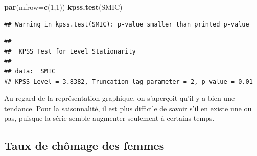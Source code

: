 \documentclass[11pt,]{article}
\newenvironment{Shaded}{\begin{snugshade}}{\end{snugshade}}
\newcommand{\KeywordTok}[1]{\textcolor[rgb]{0.13,0.29,0.53}{\textbf{{#1}}}}
\newcommand{\DataTypeTok}[1]{\textcolor[rgb]{0.13,0.29,0.53}{{#1}}}
\newcommand{\DecValTok}[1]{\textcolor[rgb]{0.00,0.00,0.81}{{#1}}}
\newcommand{\StringTok}[1]{\textcolor[rgb]{0.31,0.60,0.02}{{#1}}}
\newcommand{\NormalTok}[1]{{#1}}
\begin{document}
\begin{Shaded}
\begin{Highlighting}[]
  \KeywordTok{par}\NormalTok{(}\DataTypeTok{mfrow=}\KeywordTok{c}\NormalTok{(}\DecValTok{1}\NormalTok{,}\DecValTok{1}\NormalTok{))}
  \KeywordTok{kpss.test}\NormalTok{(SMIC)}
\end{Highlighting}
\end{Shaded}

\begin{verbatim}
## Warning in kpss.test(SMIC): p-value smaller than printed p-value
\end{verbatim}

\begin{verbatim}
## 
##  KPSS Test for Level Stationarity
## 
## data:  SMIC
## KPSS Level = 3.8382, Truncation lag parameter = 2, p-value = 0.01
\end{verbatim}

Au regard de la représentation graphique, on s'aperçoit qu'il y a bien
une tendance. Pour la saisonnalité, il est plus difficile de savoir s'il
en existe une ou pas, puisque la série semble augmenter seulement à
certains temps.

\subsection{Taux de chômage des
femmes}\label{taux-de-chomage-des-femmes}

\begin{Shaded}
\end{Shaded}
\end{document}
